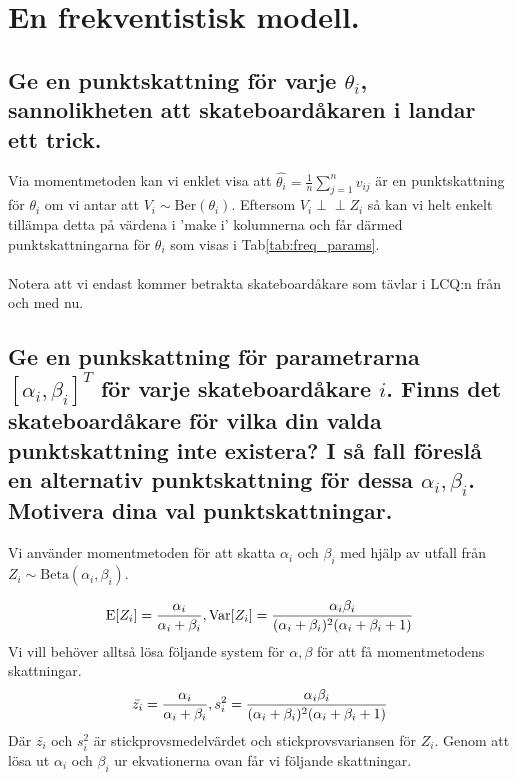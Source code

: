 \documentclass{article}
\newcommand{\independent}{\perp\!\!\!\!\perp}
\begin{document}
\section{En frekventistisk modell.}
\subsection{Ge en punktskattning för varje $\theta_i$, sannolikheten att skateboardåkaren i landar ett trick.}
Via momentmetoden kan vi enklet visa att $\hat{\theta_i} = \frac{1}{n}\sum_{j=1}^n v_{ij}$ är en punktskattning för $\theta_i$ om vi antar att $V_i \sim \text{Ber}(\theta_i)$.
Eftersom $V_i \independent Z_i$ så kan vi helt enkelt tillämpa detta på värdena i 'make i' kolumnerna och får därmed punktskattningarna för $\theta_i$ som visas i Tab\ref{tab:freq_params}. 
\\ \\
Notera att vi endast kommer betrakta skateboardåkare som tävlar i LCQ:n från och med nu.

\subsection{Ge en punkskattning för parametrarna $[\alpha_i, \beta_i]^T$ för varje skateboardåkare $i$. 
Finns det skateboardåkare för vilka din valda punktskattning inte existera? 
I så fall föreslå en alternativ punktskattning för dessa $\alpha_i, \beta_i$. Motivera dina val punktskattningar.}

Vi använder momentmetoden för att skatta $\alpha_i$ och $\beta_i$ med hjälp av utfall från $Z_i \sim \text{Beta}(\alpha_i, \beta_i)$.

\begin{equation*}
    \text{E}[Z_i] = \frac{\alpha_i}{\alpha_i + \beta_i}, \text{Var}[Z_i] = \frac{\alpha_i\beta_i}{(\alpha_i + \beta_i)^2(\alpha_i + \beta_i + 1)} \\
\end{equation*}
Vi vill behöver alltså lösa följande system för $\alpha, \beta$ för att få momentmetodens skattningar.
\begin{equation*}
    \bar{z_i} = \frac{\alpha_i}{\alpha_i + \beta_i}, s_i^2 = \frac{\alpha_i\beta_i}{(\alpha_i + \beta_i)^2(\alpha_i + \beta_i + 1)} \\
\end{equation*}
Där $\bar{z_i}$ och $s_i^2$ är stickprovsmedelvärdet och stickprovsvariansen för $Z_i$. Genom att lösa ut $\alpha_i$ och $\beta_i$ ur ekvationerna ovan får vi följande skattningar.
\end{document}

